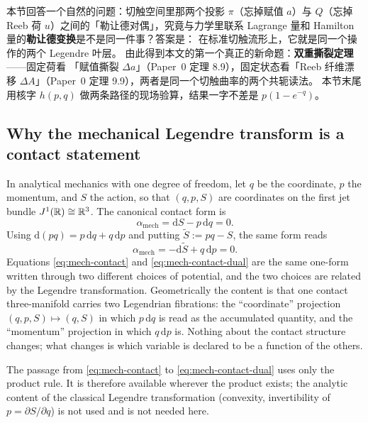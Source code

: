 
\begin{cnread}
本节回答一个自然的问题：切触空间里那两个投影 $\pi$（忘掉赋值 $a$）与
$Q$（忘掉 Reeb 荷 $u$）之间的「勒让德对偶」，究竟与力学里联系
Lagrange 量和 Hamilton 量的\textbf{勒让德变换}是不是同一件事？答案是：
在标准切触流形上，它就是同一个操作的两个 Legendre 叶层。
由此得到本文的第一个真正的新命题：\textbf{双重撕裂定理}——固定荷看
「赋值撕裂 $\Delta a$」（Paper~0 定理 8.9），固定状态看「Reeb 纤维漂移
$\Delta A$」（Paper~0 定理 9.9），两者是同一个切触曲率的两个共轭读法。
本节末尾用核字 $h(p,q)$ 做两条路径的现场验算，结果一字不差是
$p(1-e^{-q})$。
\end{cnread}

\subsection{Why the mechanical Legendre transform is a contact statement}

In analytical mechanics with one degree of freedom, let $q$ be the coordinate,
$p$ the momentum, and $S$ the action, so that $(q,p,S)$ are coordinates on the
first jet bundle $J^1(\mathbb{R})\cong\mathbb{R}^3$.  The canonical contact form is
\begin{equation}\label{eq:mech-contact}
  \alpha_{\mathrm{mech}}=\mathrm dS-p\,\mathrm dq=0 .
\end{equation}
Using $\mathrm d(pq)=p\,\mathrm dq+q\,\mathrm dp$ and putting
$\tilde S:=pq-S$, the same form reads
\begin{equation}\label{eq:mech-contact-dual}
  \alpha_{\mathrm{mech}}=-\mathrm d\tilde S+q\,\mathrm dp=0 .
\end{equation}
Equations \eqref{eq:mech-contact} and \eqref{eq:mech-contact-dual} are the same
one-form written through two different choices of potential, and the two
choices are related by the Legendre transformation.  Geometrically the content
is that one contact three-manifold carries two Legendrian fibrations: the
``coordinate'' projection $(q,p,S)\mapsto(q,S)$ in which $p\,\mathrm dq$ is read
as the accumulated quantity, and the ``momentum'' projection in which
$q\,\mathrm dp$ is.  Nothing about the contact structure changes; what changes is
which variable is declared to be a function of the others.

\begin{remark}
The passage from \eqref{eq:mech-contact} to \eqref{eq:mech-contact-dual} uses
only the product rule.  It is therefore available wherever the product exists;
the analytic content of the classical Legendre transformation (convexity,
invertibility of $p=\partial S/\partial q$) is not used and is not needed here.
\end{remark}

